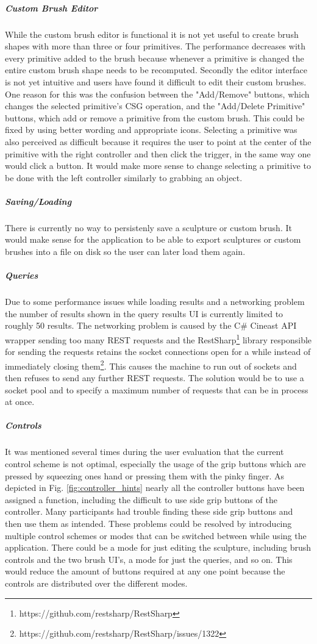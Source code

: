 \subparagraph{Custom Brush Editor}
While the custom brush editor is functional it is not yet useful to create brush shapes with more than three or four primitives. The performance decreases with every primitive added to the brush because whenever a primitive is changed the entire custom brush shape needs to be recomputed. Secondly the editor interface is not yet intuitive and users have found it difficult to edit their custom brushes. One reason for this was the confusion between the "Add/Remove" buttons, which changes the selected primitive's CSG operation, and the "Add/Delete Primitive" buttons, which add or remove a primitive from the custom brush. This could be fixed by using better wording and appropriate icons. Selecting a primitive was also perceived as difficult because it requires the user to point at the center of the primitive with the right controller and then click the trigger, in the same way one would click a button. It would make more sense to change selecting a primitive to be done with the left controller similarly to grabbing an object.

\subparagraph{Saving/Loading}
There is currently no way to persistenly save a sculpture or custom brush. It would make sense for the application to be able to export sculptures or custom brushes into a file on disk so the user can later load them again.

\subparagraph{Queries}
Due to some performance issues while loading results and a networking problem the number of results shown in the query results UI is currently limited to roughly 50 results. The networking problem is caused by the C\# Cineast API wrapper sending too many REST requests and the RestSharp\footnote{https://github.com/restsharp/RestSharp} library responsible for sending the requests retains the socket connections open for a while instead of immediately closing them\footnote{https://github.com/restsharp/RestSharp/issues/1322}. This causes the machine to run out of sockets and then refuses to send any further REST requests. The solution would be to use a socket pool and to specify a maximum number of requests that can be in process at once.

\subparagraph{Controls}
It was mentioned several times during the user evaluation that the current control scheme is not optimal, especially the usage of the grip buttons which are pressed by squeezing ones hand or pressing them with the pinky finger. As depicted in Fig. \ref{fig:controller_hints} nearly all the controller buttons have been assigned a function, including the difficult to use side grip buttons of the controller. Many participants had trouble finding these side grip buttons and then use them as intended. These problems could be resolved by introducing multiple control schemes or modes that can be switched between while using the application. There could be a mode for just editing the sculpture, including brush controls and the two brush UI's, a mode for just the queries, and so on. This would reduce the amount of buttons required at any one point because the controls are distributed over the different modes.
